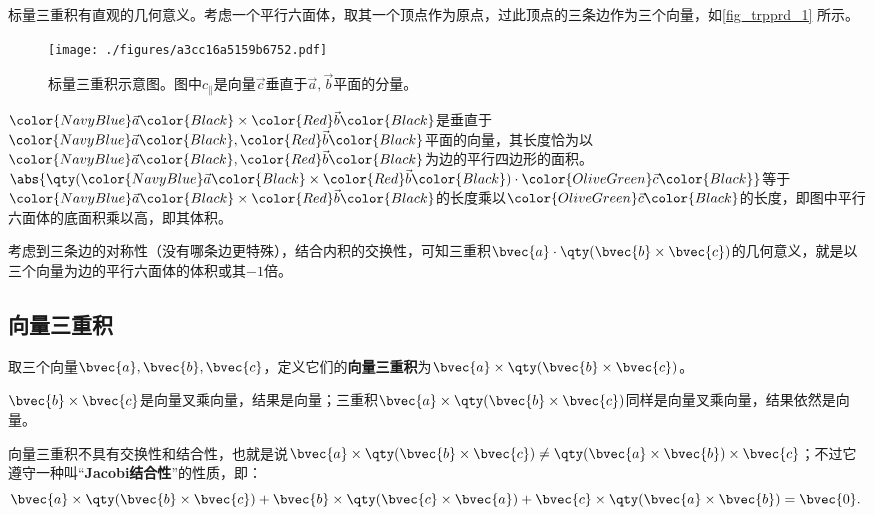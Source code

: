 标量三重积有直观的几何意义。考虑一个平行六面体，取其一个顶点作为原点，过此顶点的三条边作为三个向量，如\autoref{fig_trpprd_1} 所示。




\begin{figure}[ht]
\centering
\texttt{[image: ./figures/a3cc16a5159b6752.pdf]}
\caption{标量三重积示意图。图中$c_\parallel$是向量$\vec{c}$垂直于$\vec{a}, \vec{b}$平面的分量。} \label{fig_trpprd_1}
\end{figure}

$\color{NavyBlue}\vec{a}\color{Black}\times\color{Red}\vec{b}\color{Black}$是垂直于$\color{NavyBlue}\vec{a}\color{Black}, \color{Red}\vec{b}\color{Black}$平面的向量，其长度恰为以$\color{NavyBlue}\vec{a}\color{Black}, \color{Red}\vec{b}\color{Black}$为边的平行四边形的面积。$\abs{\qty(\color{NavyBlue}\vec{a}\color{Black}\times\color{Red}\vec{b}\color{Black})\cdot\color{OliveGreen}\vec{c}\color{Black}}$等于$\color{NavyBlue}\vec{a}\color{Black}\times\color{Red}\vec{b}\color{Black}$的长度乘以$\color{OliveGreen}\vec{c}\color{Black}$的长度，即图中平行六面体的底面积乘以高，即其体积。

考虑到三条边的对称性（没有哪条边更特殊），结合内积的交换性，可知三重积$\bvec{a}\cdot\qty(\bvec{b}\times\bvec{c})$的几何意义，就是以三个向量为边的平行六面体的体积或其$-1$倍。





\subsection{向量三重积}


取三个向量$\bvec{a}, \bvec{b}, \bvec{c}$，定义它们的\textbf{向量三重积}为$\bvec{a}\times\qty(\bvec{b}\times\bvec{c})$。

$\bvec{b}\times\bvec{c}$是向量叉乘向量，结果是向量；三重积$\bvec{a}\times\qty(\bvec{b}\times\bvec{c})$同样是向量叉乘向量，结果依然是向量。



向量三重积不具有交换性和结合性，也就是说$\bvec{a}\times\qty(\bvec{b}\times\bvec{c})\neq \qty(\bvec{a}\times\bvec{b})\times\bvec{c}$；不过它遵守一种叫“\textbf{Jacobi结合性}”的性质，即：
\begin{equation}
\bvec{a}\times\qty(\bvec{b}\times\bvec{c})+\bvec{b}\times\qty(\bvec{c}\times\bvec{a})+\bvec{c}\times\qty(\bvec{a}\times\bvec{b})=\bvec{0}. ~
\end{equation}





